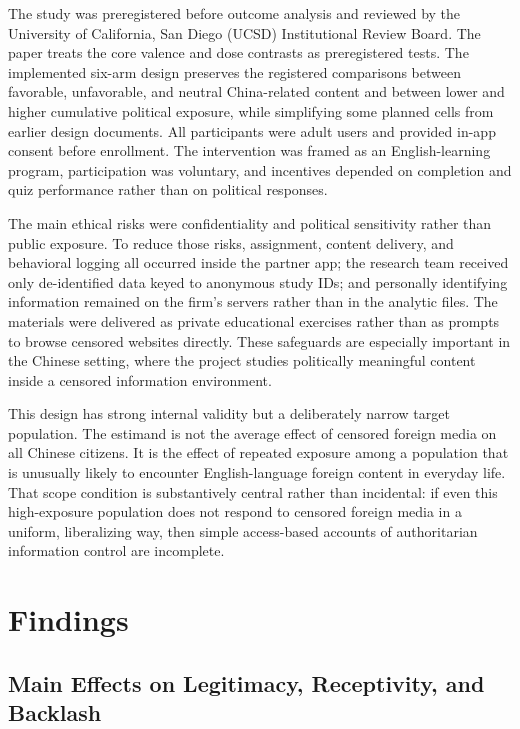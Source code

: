\documentclass[12pt,american]{article}
\begin{document}
The study was preregistered before outcome analysis and reviewed by the University of California, San Diego (UCSD) Institutional Review Board. The paper treats the core valence and dose contrasts as preregistered tests. The implemented six-arm design preserves the registered comparisons between favorable, unfavorable, and neutral China-related content and between lower and higher cumulative political exposure, while simplifying some planned cells from earlier design documents. All participants were adult users and provided in-app consent before enrollment. The intervention was framed as an English-learning program, participation was voluntary, and incentives depended on completion and quiz performance rather than on political responses.
	
The main ethical risks were confidentiality and political sensitivity rather than public exposure. To reduce those risks, assignment, content delivery, and behavioral logging all occurred inside the partner app; the research team received only de-identified data keyed to anonymous study IDs; and personally identifying information remained on the firm's servers rather than in the analytic files. The materials were delivered as private educational exercises rather than as prompts to browse censored websites directly. These safeguards are especially important in the Chinese setting, where the project studies politically meaningful content inside a censored information environment.
	
This design has strong internal validity but a deliberately narrow target population. The estimand is not the average effect of censored foreign media on all Chinese citizens. It is the effect of repeated exposure among a population that is unusually likely to encounter English-language foreign content in everyday life. That scope condition is substantively central rather than incidental: if even this high-exposure population does not respond to censored foreign media in a uniform, liberalizing way, then simple access-based accounts of authoritarian information control are incomplete.
	
	\section*{Findings}
	
	\subsection*{Main Effects on Legitimacy, Receptivity, and Backlash}
	
\end{document}
